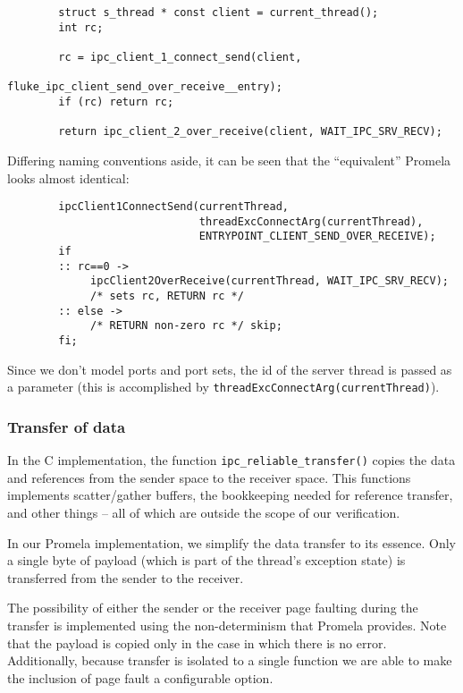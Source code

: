 \begin{verbatim}
        struct s_thread * const client = current_thread();
        int rc;

        rc = ipc_client_1_connect_send(client,
                                       fluke_ipc_client_send_over_receive__entry);
        if (rc) return rc;

        return ipc_client_2_over_receive(client, WAIT_IPC_SRV_RECV);
\end{verbatim}

Differing naming conventions aside, it can be seen that the 
``equivalent'' Promela looks almost identical:

\begin{verbatim}
        ipcClient1ConnectSend(currentThread,
                              threadExcConnectArg(currentThread),
                              ENTRYPOINT_CLIENT_SEND_OVER_RECEIVE);
        if 
        :: rc==0 ->
             ipcClient2OverReceive(currentThread, WAIT_IPC_SRV_RECV);
             /* sets rc, RETURN rc */
        :: else ->
             /* RETURN non-zero rc */ skip;
        fi;
\end{verbatim}

Since we don't model ports and port sets, the id of the
server thread is passed as a parameter (this is accomplished by
{\tt threadExcConnectArg(currentThread)}).


\subsubsection{Transfer of data}
In the C implementation, the function {\tt ipc_reliable_transfer()}
copies the data and references from the sender space to the receiver space.  
This functions implements scatter/gather buffers, the bookkeeping
needed for reference transfer, and other things -- all of which are
outside the scope of our verification. 

In our Promela implementation, we simplify the data transfer to its
essence. Only a single byte of payload (which is part of the thread's 
exception state) is transferred from the sender to the receiver. 

The possibility of either the sender or the receiver page faulting
during the transfer is implemented using the non-determinism that
Promela provides.  Note that the payload is copied only in the case in
which there is no error.  Additionally, because transfer is isolated to 
a single function we are able to make the inclusion of page fault
a configurable option.

